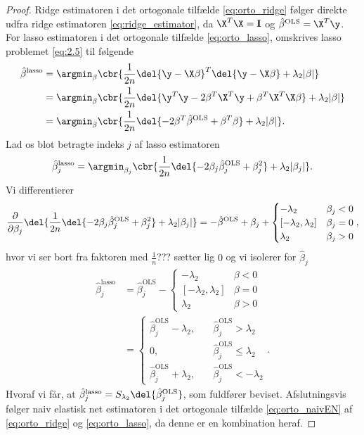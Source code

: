 \begin{proof}
Ridge estimatoren i det ortogonale tilfælde \eqref{eq:orto_ridge} følger direkte udfra ridge estimatoren \eqref{eq:ridge_estimator}, da \(\X^T \X = \mathbf{I}\) og \(\hat{\beta}^\text{OLS} = \X^T \y\).
For lasso estimatoren i det ortogonale tilfælde \eqref{eq:orto_lasso}, omskrives lasso problemet \eqref{eq:2.5} til følgende
\begin{align*}
\hat{\beta}^\text{lasso} &= \argmin_{\beta} \cbr{\frac{1}{2n} \del{\y - \X \beta}^T \del{\y - \X \beta} + \lambda_2 \vert \beta \vert} \\
&= \argmin_{\beta} \cbr{\frac{1}{2n} \del{\y^T \y - 2 \beta^T \X^T \y + \beta^T \X^T \X \beta} + \lambda_2 \vert \beta \vert} \\
&= \argmin_{\beta} \cbr{\frac{1}{2n} \del{ - 2 \beta^T \hat{\beta}^\text{OLS} + \beta^T \beta} + \lambda_2 \vert \beta \vert}.
\end{align*}
Lad os blot betragte indeks \(j\) af lasso estimatoren
\begin{align*}
\hat{\beta}_j^\text{lasso} = \argmin_{\beta_j} \cbr{\frac{1}{2n} \del{ - 2 \beta_j \hat{\beta}_j^\text{OLS} + \beta_j^2} + \lambda_2 \vert \beta_j \vert}.
\end{align*}
Vi differentierer
\begin{align*}
\frac{\partial}{\partial \beta_j} \del{\frac{1}{2n} \del{ - 2 \beta_j \hat{\beta}_j^\text{OLS} + \beta_j^2} + \lambda_2 \vert \beta_j \vert}
=-\hat{\beta}^\text{OLS} + \beta_j + \begin{cases}
-\lambda_2 \quad &\beta_j < 0 \\
[-\lambda_2, \lambda_2] & \beta_j = 0 \\
\lambda_2 & \beta_j >0 
\end{cases},
\end{align*}
hvor vi ser bort fra faktoren med \(\frac{1}{n}\)??? sætter lig \(0\) og vi isolerer for \(\hat{\beta}_j\)
\begin{align*}
\hat{\beta}_j^\text{lasso} &= \hat{\beta}_j^\text{OLS} - \begin{cases}
-\lambda_2 \quad &\beta < 0 \\
[-\lambda_2, \lambda_2] & \beta = 0 \\
\lambda_2 & \beta >0 
\end{cases} \\
&= \begin{cases}
\hat{\beta}_j^\text{OLS} - \lambda_2, \quad &\hat{\beta}_j^\text{OLS} > \lambda_2 \\
0, &\hat{\beta}_j^\text{OLS} \leq \lambda_2 \\
\hat{\beta}_j^\text{OLS} + \lambda_2, \quad &\hat{\beta}_j^\text{OLS} < - \lambda_2
\end{cases}. 
\end{align*}
Hvoraf vi får, at \(\hat{\beta}_j^\text{lasso} = S_{\lambda_2} \del{ \hat{\beta}_j^\text{OLS}} \), som fuldfører beviset.
Afslutningsvis følger naiv elastisk net estimatoren i det ortogonale tilfælde \eqref{eq:orto_naivEN} af \eqref{eq:orto_ridge} og \eqref{eq:orto_lasso}, da denne er en kombination heraf.
\end{proof}
